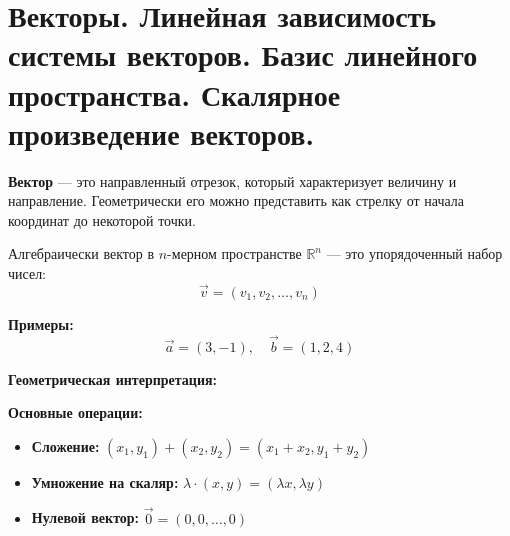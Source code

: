 \section{Векторы. Линейная зависимость системы векторов. Базис линейного пространства. Скалярное произведение векторов.}

\textbf{Вектор} — это направленный отрезок, который характеризует величину и направление. Геометрически его можно представить как стрелку от начала координат до некоторой точки.

Алгебраически вектор в $n$-мерном пространстве $\mathbb{R}^n$ — это упорядоченный набор чисел:
\[
\vec{v} = (v_1, v_2, \dots, v_n)
\]

\textbf{Примеры:}
\[
\vec{a} = (3, -1), \quad \vec{b} = (1, 2, 4)
\]

\vspace{1em}
\textbf{Геометрическая интерпретация:}
\begin{center}
\end{center}

\vspace{1em}
\textbf{Основные операции:}
\begin{itemize}
  \item \textbf{Сложение:} $(x_1, y_1) + (x_2, y_2) = (x_1 + x_2, y_1 + y_2)$
  \item \textbf{Умножение на скаляр:} $\lambda \cdot (x, y) = (\lambda x, \lambda y)$
  \item \textbf{Нулевой вектор:} $\vec{0} = (0, 0, \dots, 0)$
\end{itemize}

\begin{center}
\end{center}

